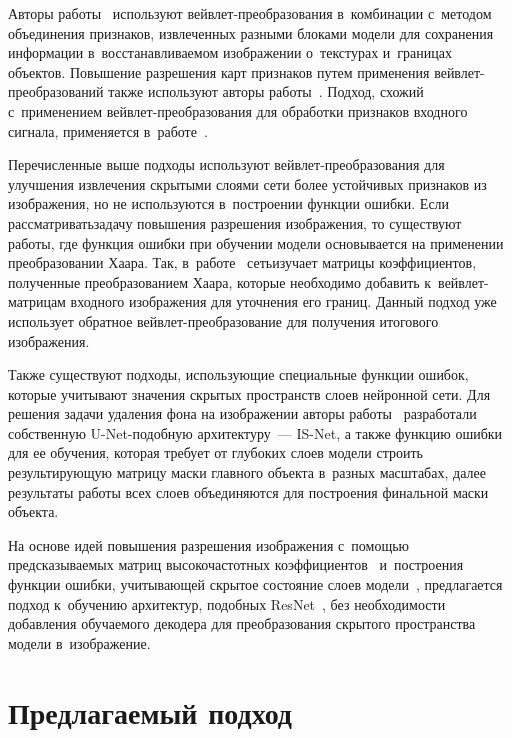 \begin{multicols}{2}
Авторы работы~\cite{WaveletPooling} используют вейв\-лет-пре\-обра\-зо\-ва\-ния 
в~комбинации с~методом объединения признаков, извлеченных разными блоками модели 
для сохранения информации в~восстанавливаемом изоб\-ра\-же\-нии о~текстурах и~границах 
объектов. Повышение разрешения карт признаков путем применения вейв\-лет-пре\-обра\-зо\-ва\-ний также используют авторы работы~\cite{MDIWT}. Подход, схожий 
с~применением вейв\-лет-пре\-обра\-зо\-ва\-ния для обработки признаков входного сигнала, 
применяется в~работе~\cite{WINNet}.

Перечисленные выше подходы используют вейв\-лет-пре\-обра\-зо\-ва\-ния для улучшения 
извлечения скрытыми слоями сети более устойчивых признаков из изображения, но не 
используются в~построении функции ошибки. Если рассматривать\linebreak задачу повышения 
разрешения изображения, то существуют работы, где функция ошибки при обуче\-нии 
модели основывается на применении преобразовании Хаара. Так, в~работе~\cite{DWB} 
сеть\linebreak изучает \mbox{матрицы} коэффициентов, полученные преобразованием Хаара, которые 
необходимо добавить к~вейв\-лет-мат\-ри\-цам входного изображения для уточнения его 
границ. Данный подход уже использует обратное вейв\-лет-пре\-обра\-зо\-ва\-ние для 
получения итогового изображения.

Также существуют подходы, использующие специальные функции ошибок, которые 
учитывают значения скрытых пространств слоев нейронной сети. Для решения задачи 
удаления фона на изображении авторы работы~\cite{IS_NET} разработали собственную 
U-Net-подобную архитектуру~--- IS-Net, а также функцию ошибки для ее обуче\-ния, 
которая требует от глубоких слоев модели строить результирующую матрицу маски 
главного объекта в~разных масштабах, далее результаты работы всех слоев 
объединяются для построения финальной маски объекта.

На основе идей повышения разрешения изоб\-ра\-же\-ния с~помощью предсказываемых матриц 
высокочастотных коэффициентов~\cite{DWB} и~по\-стро\-ения функции ошибки, 
учи\-ты\-ва\-ющей скрытое со\-сто\-яние слоев модели~\cite{IS_NET}, предлагается подход 
к~обуче\-нию архитектур, подобных ResNet~\cite{ResNet}, без не\-об\-хо\-ди\-мости до\-бав\-ле\-ния 
обучаемого декодера для преобразования скрытого пространства модели в~изоб\-ра\-же\-ние.


\section{Предлагаемый подход}


\end{multicols}
